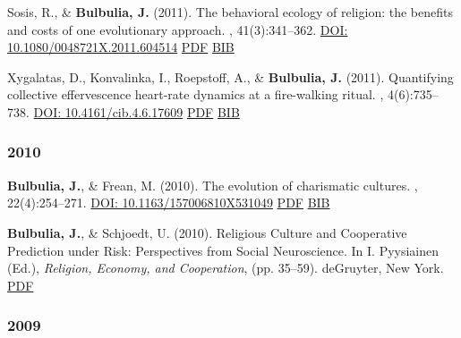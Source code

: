 \documentclass{article}
\begin{document}
\begin{thebibliography}{99}
Sosis, R., \& {\bf Bulbulia, J.} (2011).
\newblock The behavioral ecology of religion: the benefits and costs of one
  evolutionary approach.
, 41(3):341--362. 
\href{https://doi.org/10.1080/0048721X.2011.604514}{DOI: 10.1080/0048721X.2011.604514} \newblock \href{https://www.dropbox.com/s/x6qyj01trcuhfzd/SosisBulbuliaBehEcoRel.pdf?dl=0}{PDF} \href{https://scholar.google.co.nz/scholar.bib?q=info:6KFNe9NrUB0J:scholar.google.com/&output=citation&scisig=AAGBfm0AAAAAVQLQzUevx-JM_Jt5ZX4k_9fxb6dV3u0s&scisf=4&hl=en}{BIB}\


Xygalatas, D., Konvalinka, I., Roepstoff, A., \& {\bf Bulbulia, J.} (2011).
\newblock Quantifying collective effervescence heart-rate dynamics at a
  fire-walking ritual.
, 4(6):735--738.\newblock 
\href{https://doi.org/10.4161/cib.4.6.17609}{DOI: 10.4161/cib.4.6.17609}
\href{https://www.dropbox.com/s/k7sd19xlfiq8huo/XygalatasCIB4-6.pdf}{PDF} \href{https://scholar.google.co.nz/scholar.bib?q=info:ibIMcXjOt4sJ:scholar.google.com/&output=citation&scisig=AAGBfm0AAAAAVQLRpR7fjyHaIZem3vp4nLctXQZrVMcE&scisf=4&hl=en}{BIB} 



\subsubsection*{2010}



{\bf Bulbulia, J.}, \& Frean, M. (2010).
\newblock The evolution of charismatic cultures.
, 22(4):254--271. 
\href{https://doi.org/10.1163/157006810X531049}{DOI: 10.1163/157006810X531049}  \href{http://db.tt/3EhwMDv}{PDF} \href{https://scholar.google.co.nz/scholar.bib?q=info:CMgUm8a7Y_QJ:scholar.google.com/&output=citation&scisig=AAGBfm0AAAAAVQPQTOqB9pbHY7FLyLOV1miSoIIZ5shl&scisf=4&hl=en}{BIB}


{\bf Bulbulia, J.}, \& Schjoedt, U. (2010).
\newblock Religious Culture and Cooperative Prediction under Risk: Perspectives from Social Neuroscience.
\newblock In I. Pyysiainen (Ed.), {\em Religion, Economy, and Cooperation},
 (pp. 35--59). deGruyter, New York. \href{http://db.tt/MOZlvjr}{PDF}


\subsubsection*{2009}




\end{thebibliography}
\end{document}
